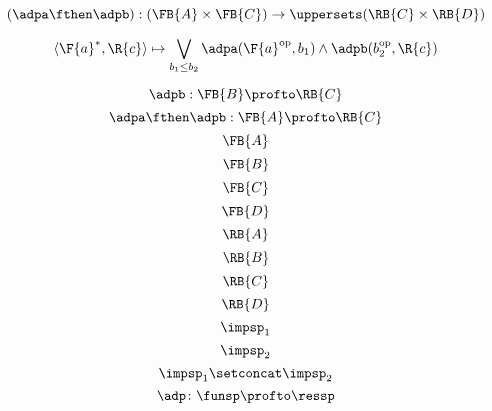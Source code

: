 {\begin{forslides}
        
        \begin{equation}
            \label{eq:adpM12us}
            (\adpa\fthen\adpb):(\FB{A} \times \FB{C})  \to\uppersets (\RB{C} \times \RB{D})
        \end{equation}
        
        \begin{equation}
            \label{eq:adp12pfexpr}
            \langle\F{a}^*, \R{c}\rangle \mapsto \bigvee_{b_1\leq b_2} \adpa(\F{a}^{\text{op}}, b_1) \wedge \adpb(b_2^{\text{op}}, \R{c})
        \end{equation}
        
        \begin{equation}
            \label{eq:adp2}
            \adpb: \FB{B} \profto  \RB{C}
        \end{equation}
        \begin{equation}
            \label{eq:adp1adp2}
            \adpa\fthen\adpb: \FB{A} \profto  \RB{C}
        \end{equation}
        \begin{equation}
            \label{eq:FA}
            \FB{A}
        \end{equation}
        \begin{equation}
            \label{eq:FB}
            \FB{B}
        \end{equation}
        \begin{equation}
            \label{eq:FC}
            \FB{C}
        \end{equation}
        \begin{equation}
            \label{eq:FD}
            \FB{D}
        \end{equation}
        \begin{equation}
            \label{eq:RA}
            \RB{A}
        \end{equation}
        \begin{equation}
            \label{eq:RB}
            \RB{B}
        \end{equation}
        \begin{equation}
            \label{eq:RC}
            \RB{C}
        \end{equation}
        \begin{equation}
            \label{eq:RD}
            \RB{D}
        \end{equation}
        \begin{equation}
            \label{eq:impsp1}
            \impsp_1
        \end{equation}
        \begin{equation}
            \label{eq:impsp2}
            \impsp_2
        \end{equation}
        \begin{equation}
            \label{eq:impsp12}
            \impsp_{1} \setconcat \impsp_{2}
        \end{equation}
        \begin{equation}
            \label{eq:dproba}
            \adp \colon \funsp \profto \ressp
        \end{equation}
        

\end{forslides}}
